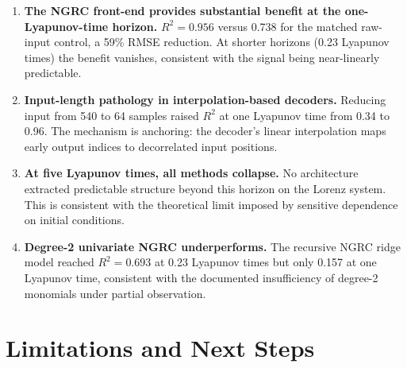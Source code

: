 \documentclass[11pt,a4paper]{article}
\begin{document}
\begin{enumerate}[leftmargin=*]
  \item \textbf{The NGRC front-end provides substantial benefit at the one-Lyapunov-time horizon.}
    $R^2 = 0.956$ versus 0.738 for the matched raw-input control, a 59\% RMSE reduction.
    At shorter horizons (0.23 Lyapunov times) the benefit vanishes, consistent with the signal being near-linearly predictable.

  \item \textbf{Input-length pathology in interpolation-based decoders.}
    Reducing input from 540 to 64 samples raised $R^2$ at one Lyapunov time from 0.34 to 0.96.
    The mechanism is anchoring: the decoder's linear interpolation maps early output indices to decorrelated input positions.

  \item \textbf{At five Lyapunov times, all methods collapse.}
    No architecture extracted predictable structure beyond this horizon on the Lorenz system.
    This is consistent with the theoretical limit imposed by sensitive dependence on initial conditions.

  \item \textbf{Degree-2 univariate NGRC underperforms.}
    The recursive NGRC ridge model reached $R^2 = 0.693$ at 0.23 Lyapunov times but only 0.157 at one Lyapunov time, consistent with the documented insufficiency of degree-2 monomials under partial observation.
\end{enumerate}


\section{Limitations and Next Steps}
\end{document}
